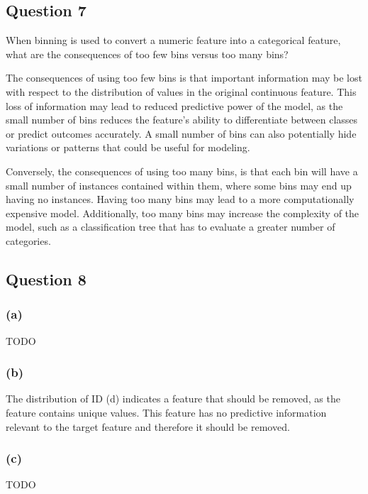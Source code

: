 \documentclass[10pt]{article}
\begin{document}
\subsection*{Question 7}

When binning is used to convert a numeric feature into a categorical feature, what are the consequences
of too few bins versus too many bins?

The consequences of using too few bins is that important information may be lost with respect to the
distribution of values in the original continuous feature. This loss of information may lead to reduced
predictive power of the model, as the small number of bins
reduces the feature's ability to differentiate between classes or predict outcomes accurately. A small number of
bins can also potentially hide variations or patterns that could be useful for modeling.

Conversely, the consequences of using too many bins, is that each bin will have a small number of instances
contained within them, where some bins may end up having no instances. Having too many bins may lead to
a more computationally expensive model. Additionally, too many bins may increase the complexity of the model,
such as a classification tree that has to evaluate a greater number of categories.

\subsection*{Question 8}

\subsubsection*{(a)}

TODO

\subsubsection*{(b)}

The distribution of ID (d) indicates a feature that should be removed, as the feature contains unique values.
This feature has no predictive information relevant to the target feature and therefore it should be removed.

\subsubsection*{(c)}

TODO
\end{document}
